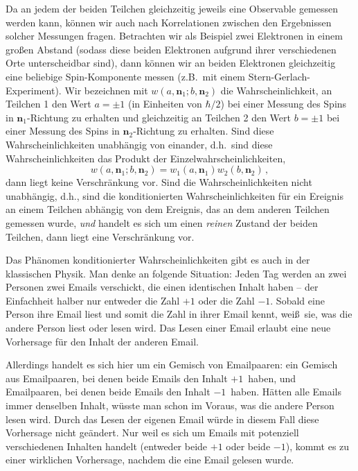 Da an jedem der beiden Teilchen gleichzeitig jeweils eine Observable gemessen werden
kann, k\"onnen wir auch nach Korrelationen zwischen den Ergebnissen solcher
Messungen fragen. Betrachten wir als Beispiel zwei Elektronen in einem gro\ss en
Abstand (sodass diese beiden Elektronen aufgrund ihrer verschiedenen Orte 
unterscheidbar sind), dann k\"onnen wir an beiden Elektronen gleichzeitig eine
beliebige Spin-Komponente messen (z.B.\ mit einem Stern-Gerlach-Experiment). 
Wir bezeichnen mit $w(a,\pmb{n}_1;b,\pmb{n}_2)$ die Wahrscheinlichkeit, an Teilchen
1 den Wert $a=\pm1$ (in Einheiten von $\hbar/2$) 
bei einer Messung des Spins in $\pmb{n}_1$-Richtung zu erhalten
und gleichzeitig an Teilchen 2 den Wert $b=\pm1$ bei einer Messung des Spins in 
$\pmb{n}_2$-Richtung zu erhalten. Sind diese Wahrscheinlichkeiten 
unabh\"angig von einander, d.h.\ sind diese Wahrscheinlichkeiten das
Produkt der Einzelwahrscheinlichkeiten, 
\begin{equation}
          w(a,\pmb{n}_1;b,\pmb{n}_2) = w_1(a,\pmb{n}_1) w_2(b,\pmb{n}_2) \, ,
\end{equation}
dann liegt keine Verschr\"ankung vor. 
Sind die Wahrscheinlichkeiten nicht unabh\"angig, d.h., sind die konditionierten
Wahrscheinlichkeiten f\"ur ein Ereignis an einem Teilchen abh\"angig von dem
Ereignis, das an dem anderen Teilchen gemessen wurde, \emph{und} handelt es sich
um einen \emph{reinen} Zustand der beiden Teilchen, dann liegt eine Verschr\"ankung vor. 

Das Ph\"anomen konditionierter 
Wahrscheinlichkeiten 
gibt es auch in der klassischen
Physik. Man denke an folgende Situation: Jeden Tag werden an zwei Personen zwei Emails
verschickt, die einen identischen Inhalt haben -- der Einfachheit halber nur
entweder die Zahl $+1$ oder die Zahl $-1$. Sobald eine Person 
ihre Email liest und somit die Zahl in ihrer Email kennt, wei\ss\ sie, was die andere
Person liest oder lesen wird. Das Lesen einer Email
erlaubt eine neue Vorhersage f\"ur den Inhalt der anderen Email. 

Allerdings handelt es sich hier um ein Gemisch von Emailpaaren: ein Gemisch aus 
Emailpaaren, bei denen beide Emails den Inhalt \glqq $+1$\grqq\ haben, und Emailpaaren, bei denen
beide Emails den Inhalt \glqq$-1$\grqq\ haben. 
H\"atten alle Emails immer
denselben Inhalt, w\"usste man schon im Voraus, was die andere Person lesen wird.
Durch das Lesen der eigenen Email w\"urde in diesem Fall diese Vorhersage nicht ge\"andert. Nur weil
es sich um Emails mit potenziell verschiedenen Inhalten handelt (entweder beide $+1$ oder beide
$-1$), kommt es zu einer wirklichen Vorhersage, nachdem die eine Email gelesen wurde.

